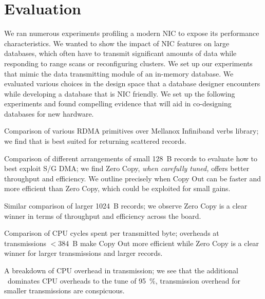 \section{Evaluation}
We ran numerous experiments profiling a modern NIC to expose its performance characteristics. 
We wanted to show the impact of NIC features on large databases, which often have to 
transmit significant amounts of data while responding to range scans or reconfiguring clusters.
We set up our experiments that mimic the data transmitting module of an in-memory database. 
We evaluated various choices in the design space that a database designer encounters while developing 
a database that is NIC friendly. We set up the following experiments and found compelling 
evidence that will aid in co-designing databases for new hardware.
\begin{myitemize}
\item Comparison of various RDMA primitives over Mellanox Infiniband verbs library; we find that  is best suited for returning scattered records.
\item Comparison of different arrangements of small 128~B records to evaluate how to best exploit S/G DMA; we find Zero Copy, {\em when carefully tuned,} offers better throughput and efficiency. We outline precisely when Copy Out can be faster 
and more efficient than Zero Copy, which could be exploited for small gains.
\item Similar comparison of larger 1024~B records; we observe Zero Copy is a clear winner in terms of throughput and efficiency across the board.
\item Comparison of CPU cycles spent per transmitted byte; overheads at transmissions $<$384~B make Copy Out more efficient while Zero Copy is a clear winner for larger transmissions and larger records.
\item A breakdown of CPU overhead in transmission; we see that the additional \memcpy ~dominates CPU overheads to the tune of 95~\%, transmission overhead for smaller transmissions are conspicuous.
\end{myitemize}



